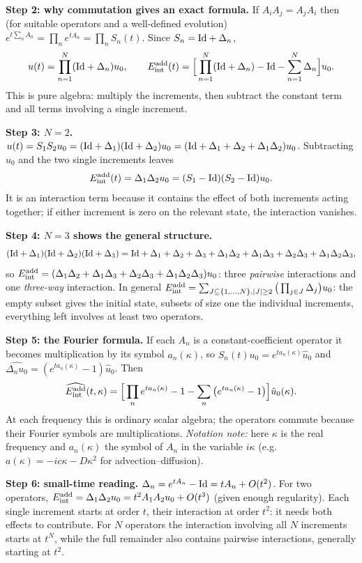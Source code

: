 \medskip\textbf{Step 2: why commutation gives an exact formula.} If $A_iA_j=A_jA_i$ then (for suitable operators and a well-defined evolution) $e^{t\sum_nA_n}=\prod_ne^{tA_n}=\prod_nS_n(t)$. Since $S_n=\mathrm{Id}+\Delta_n$,
\[
u(t)=\prod_{n=1}^N(\mathrm{Id}+\Delta_n)u_0,\qquad
E_{\mathrm{int}}^{\mathrm{add}}(t)=\Big[\prod_{n=1}^N(\mathrm{Id}+\Delta_n)-\mathrm{Id}-\sum_{n=1}^N\Delta_n\Big]u_0 .
\]
This is pure algebra: multiply the increments, then subtract the constant term and all terms involving a single increment.

\medskip\textbf{Step 3: $N=2$.} $u(t)=S_1S_2u_0=(\mathrm{Id}+\Delta_1)(\mathrm{Id}+\Delta_2)u_0=(\mathrm{Id}+\Delta_1+\Delta_2+\Delta_1\Delta_2)u_0$. Subtracting $u_0$ and the two single increments leaves
\[
E_{\mathrm{int}}^{\mathrm{add}}(t)=\Delta_1\Delta_2u_0=(S_1-\mathrm{Id})(S_2-\mathrm{Id})u_0 .
\]
It is an interaction term because it contains the effect of both increments acting together; if either increment is zero on the relevant state, the interaction vanishes.

\medskip\textbf{Step 4: $N=3$ shows the general structure.}
\[
(\mathrm{Id}+\Delta_1)(\mathrm{Id}+\Delta_2)(\mathrm{Id}+\Delta_3)=\mathrm{Id}+\Delta_1+\Delta_2+\Delta_3+\Delta_1\Delta_2+\Delta_1\Delta_3+\Delta_2\Delta_3+\Delta_1\Delta_2\Delta_3,
\]
so $E_{\mathrm{int}}^{\mathrm{add}}=(\Delta_1\Delta_2+\Delta_1\Delta_3+\Delta_2\Delta_3+\Delta_1\Delta_2\Delta_3)u_0$: three \emph{pairwise} interactions and one \emph{three-way} interaction. In general $E_{\mathrm{int}}^{\mathrm{add}}=\sum_{J\subseteq\{1,\dots,N\},|J|\ge2}\big(\prod_{j\in J}\Delta_j\big)u_0$: the empty subset gives the initial state, subsets of size one the individual increments, everything left involves at least two operators.

\medskip\textbf{Step 5: the Fourier formula.} If each $A_n$ is a constant-coefficient operator it becomes multiplication by its symbol $a_n(\kappa)$, so $\widehat{S_n(t)u_0}=e^{ta_n(\kappa)}\hat u_0$ and $\widehat{\Delta_nu_0}=(e^{ta_n(\kappa)}-1)\hat u_0$. Then
\[
\widehat{E_{\mathrm{int}}^{\mathrm{add}}}(t,\kappa)=\Big[\prod_ne^{ta_n(\kappa)}-1-\sum_n\big(e^{ta_n(\kappa)}-1\big)\Big]\hat u_0(\kappa).
\]
At each frequency this is ordinary scalar algebra; the operators commute because their Fourier symbols are multiplications. \emph{Notation note:} here $\kappa$ is the real frequency and $a_n(\kappa)$ the symbol of $A_n$ in the variable $i\kappa$ (e.g.\ $a(\kappa)=-ic\kappa-D\kappa^2$ for advection--diffusion).

\medskip\textbf{Step 6: small-time reading.} $\Delta_n=e^{tA_n}-\mathrm{Id}=tA_n+O(t^2)$. For two operators, $E_{\mathrm{int}}^{\mathrm{add}}=\Delta_1\Delta_2u_0=t^2A_1A_2u_0+O(t^3)$ (given enough regularity). Each single increment starts at order $t$, their interaction at order $t^2$: it needs both effects to contribute. For $N$ operators the interaction involving all $N$ increments starts at $t^N$, while the full remainder also contains pairwise interactions, generally starting at $t^2$.

